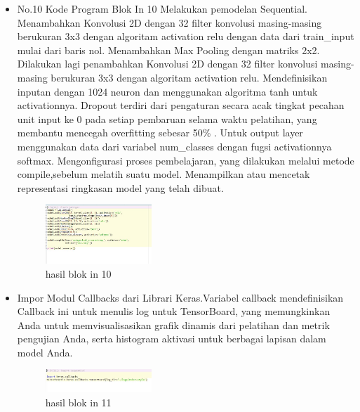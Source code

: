 \begin{enumerate}
\begin{itemize}
        \item  {No.10 Kode Program Blok In 10}
        \subitem Melakukan pemodelan Sequential.
        \subitem Menambahkan Konvolusi 2D dengan 32 filter konvolusi masing-masing berukuran 3x3 dengan algoritam activation relu dengan data dari train\_input mulai dari baris nol.
        \subitem Menambahkan Max Pooling dengan matriks 2x2.
        \subitem Dilakukan lagi penambahkan Konvolusi 2D dengan 32 filter konvolusi masing-masing berukuran 3x3 dengan algoritam activation relu.
        \subitem Mendefinisikan inputan dengan 1024 neuron dan menggunakan algoritma tanh untuk activationnya.
        \subitem Dropout terdiri dari pengaturan secara acak tingkat pecahan unit input ke 0 pada setiap pembaruan selama waktu pelatihan, yang membantu mencegah overfitting sebesar 50\% .
        \subitem Untuk output layer menggunakan data dari variabel num\_classes dengan fugsi activationnya softmax.
        \subitem Mengonfigurasi proses pembelajaran, yang dilakukan melalui metode compile,sebelum melatih suatu model.
        \subitem Menampilkan atau mencetak representasi ringkasan model yang telah dibuat.
        \begin{figure}[H]
            \includegraphics[width=4cm]{figures/1174039/chapter7/praktek10.jpg}
            \centering
            \caption{hasil blok in 10}
        \end{figure}
        
        \item  Impor Modul Callbacks dari Librari Keras.Variabel callback mendefinisikan Callback ini untuk menulis log untuk TensorBoard, yang memungkinkan Anda untuk memvisualisasikan grafik dinamis dari pelatihan dan metrik pengujian Anda, serta histogram aktivasi untuk berbagai lapisan dalam model Anda.
        \begin{figure}[H]
            \includegraphics[width=4cm]{figures/1174039/chapter7/praktek11.jpg}
            \centering
            \caption{hasil blok in 11}
        \end{figure}


\end{itemize}
\end{enumerate}
